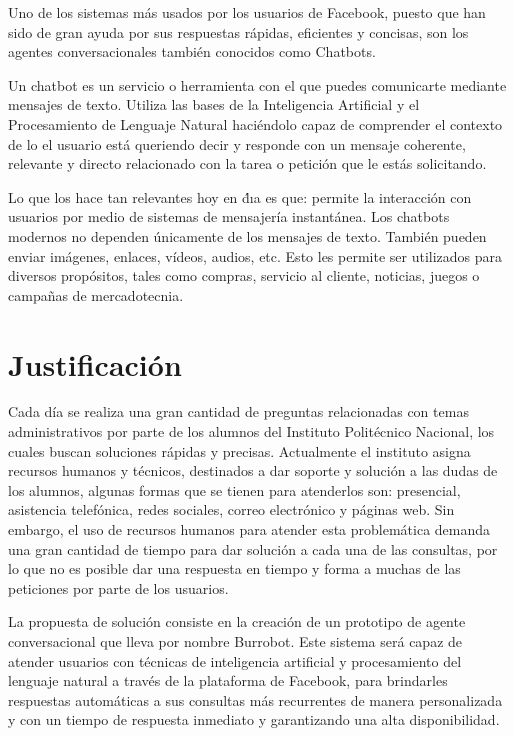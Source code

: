     
    Uno de los sistemas más usados por los usuarios de Facebook, puesto que han sido de gran ayuda por sus respuestas rápidas, eficientes y concisas, son los agentes conversacionales también conocidos como Chatbots.
    
    Un chatbot es un servicio o herramienta con el que puedes comunicarte mediante mensajes de texto. Utiliza las bases de la Inteligencia Artificial y el Procesamiento de Lenguaje Natural haciéndolo capaz de comprender el contexto de lo el usuario está queriendo decir y responde con un mensaje coherente, relevante y directo relacionado con la tarea o petición que le estás solicitando.
    
    Lo que los hace tan relevantes hoy en d́ıa es que: permite la interacción con usuarios por medio de sistemas de mensajería instantánea. Los chatbots modernos no dependen únicamente de los mensajes de texto. También pueden enviar imágenes, enlaces, vídeos, audios, etc. Esto les permite ser utilizados para diversos propósitos, tales como compras, servicio al cliente, noticias, juegos o campañas de mercadotecnia.

\section{Justificación}

    Cada día se realiza una gran cantidad de preguntas relacionadas con temas administrativos por parte de los alumnos del Instituto Politécnico Nacional, los cuales buscan soluciones rápidas y precisas. Actualmente el instituto asigna recursos humanos y técnicos, destinados a dar soporte y solución a las dudas de los alumnos, algunas formas que se tienen para atenderlos son: presencial, asistencia telefónica, redes sociales, correo electrónico y páginas web. Sin embargo, el uso de recursos humanos para atender esta problemática demanda una gran cantidad de tiempo para dar solución a cada una de las consultas, por lo que no es posible dar una respuesta en tiempo y forma a muchas de las peticiones por parte de los usuarios.
    
    La propuesta de solución consiste en la creación de un prototipo de agente conversacional que lleva por nombre Burrobot. Este sistema será capaz de atender usuarios con técnicas de inteligencia artificial y procesamiento del lenguaje natural a través de la plataforma de Facebook, para brindarles respuestas automáticas a sus consultas más recurrentes de manera personalizada y con un tiempo de respuesta inmediato y garantizando una alta disponibilidad.
    
